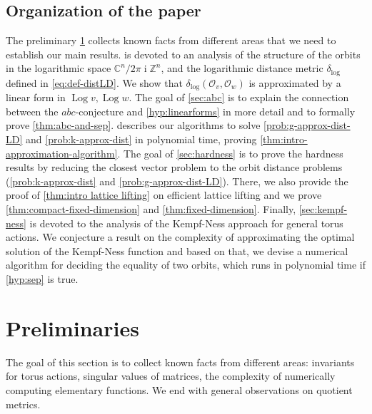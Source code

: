 \documentclass[10pt,a4paper]{article}
\theoremstyle{definition}
\DeclareMathOperator{\ii}{i}
\DeclareMathOperator{\Log}{Log}
\newcommand{\distLD}{\delta_{\log}}
\newcommand{\CC}{\mathbb{C}}
\newcommand{\ZZ}{\mathbb{Z}}
\newcommand{\OO}{\ensuremath{\mathcal{O}}}
\newcommand{\abc}{\texorpdfstring{$abc$}{abc}}
\numberwithin{equation}{section}
\begin{document}
\subsection{Organization of the paper}
The preliminary \cref{sec:prelim} collects known facts from
different areas that we need to establish our main results.
 is devoted to an analysis of the structure of the orbits
in the logarithmic space $\CC^n/2\pi\ii\ZZ^n$, and the
logarithmic distance metric $\distLD$ defined in \cref{eq:def-distLD}.
We show that $\distLD(\OO_v,\OO_w)$ is approximated by a linear form in $\Log v,\Log w$.
The goal of \cref{sec:abc} is to explain the connection
between the \abc-conjecture and \cref{hyp:linearforms}
in more detail and to formally prove \cref{thm:abc-and-sep}.
 describes our algorithms to solve \cref{prob:g-approx-dist-LD}
and \cref{prob:k-approx-dist} in polynomial time,
proving \cref{thm:intro-approximation-algorithm}.
The goal of \cref{sec:hardness} is to prove the hardness results by reducing
the closest vector problem %
to the orbit distance problems (\cref{prob:k-approx-dist} and \cref{prob:g-approx-dist-LD}).
There, we also provide the proof of \cref{thm:intro lattice lifting} on efficient lattice lifting
and we prove
\cref{thm:compact-fixed-dimension} and \cref{thm:fixed-dimension}.
Finally, \cref{sec:kempf-ness} is devoted to the analysis of
the Kempf-Ness approach for general torus actions.
We conjecture a result on the complexity of approximating the optimal solution of the Kempf-Ness function and based on that, we devise a numerical algorithm for deciding the equality of two orbits,
which runs in polynomial time if \cref{hyp:sep} is true.

\section{Preliminaries}\label{sec:prelim}

The goal of this section is to collect known facts from
different areas: invariants for torus actions, singular values of matrices,
the complexity of numerically computing elementary functions.
We end with general observations on quotient metrics.
\end{document}
